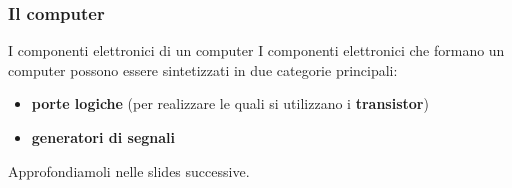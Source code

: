 \begin{frame}
	\frametitle{Il computer}
	
	\begin{block}{I componenti elettronici di un computer}
		I componenti elettronici che formano un computer possono essere sintetizzati in due categorie principali:
		\begin{itemize}
			\item \textbf{porte logiche} (per realizzare le quali si utilizzano i \textbf{transistor})
			\item \textbf{generatori di segnali}
		\end{itemize}
		
		Approfondiamoli nelle slides successive.
	\end{block}
\end{frame}




